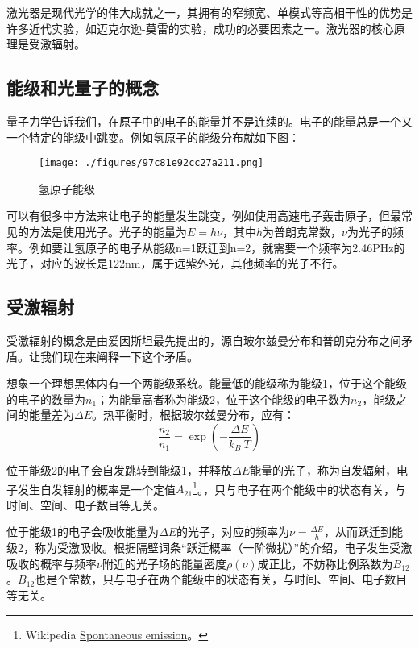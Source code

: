 

激光器是现代光学的伟大成就之一，其拥有的窄频宽、单模式等高相干性的优势是许多近代实验，如迈克尔逊-莫雷的实验，成功的必要因素之一。激光器的核心原理是受激辐射。

\subsection{能级和光量子的概念}
量子力学告诉我们，在原子中的电子的能量并不是连续的。电子的能量总是一个又一个特定的能级中跳变。例如氢原子的能级分布就如下图：\begin{figure}[ht]
\centering
\texttt{[image: ./figures/97c81e92cc27a211.png]}
\caption{氢原子能级} \label{fig_LaserT_1}
\end{figure}
可以有很多中方法来让电子的能量发生跳变，例如使用高速电子轰击原子，但最常见的方法是使用光子。光子的能量为$E=h\nu$，其中$h$为普朗克常数，$\nu$为光子的频率。例如要让氢原子的电子从能级n=1跃迁到n=2，就需要一个频率为2.46PHz的光子，对应的波长是122nm，属于远紫外光，其他频率的光子不行。
\subsection{受激辐射}
受激辐射的概念是由爱因斯坦最先提出的，源自玻尔兹曼分布和普朗克分布之间矛盾。让我们现在来阐释一下这个矛盾。

想象一个理想黑体内有一个两能级系统。能量低的能级称为能级1，位于这个能级的电子的数量为$n_1$；为能量高者称为能级2，位于这个能级的电子数为$n_2$，能级之间的能量差为$\Delta E$。热平衡时，根据玻尔兹曼分布，应有：
\begin{equation}
\frac{n_2}{n_1}=\exp(-\frac{\Delta E}{k_B \ T})
\end{equation}

位于能级2的电子会自发跳转到能级1，并释放$\Delta E$能量的光子，称为自发辐射，电子发生自发辐射的概率是一个定值$A_{21}$\footnote{ Wikipedia \href{https://en.wikipedia.org/wiki/Spontaneous_emission#Theory}{Spontaneous emission}。}。，只与电子在两个能级中的状态有关，与时间、空间、电子数目等无关。

位于能级1的电子会吸收能量为$\Delta E$的光子，对应的频率为$\nu=\frac{\Delta E}{h}$，从而跃迁到能级2，称为受激吸收。根据隔壁词条“跃迁概率（一阶微扰）”的介绍，电子发生受激吸收的概率与频率$\nu$附近的光子场的能量密度$\rho(\nu)$成正比，不妨称比例系数为$B_{12}$。$B_{12}$也是个常数，只与电子在两个能级中的状态有关，与时间、空间、电子数目等无关。

